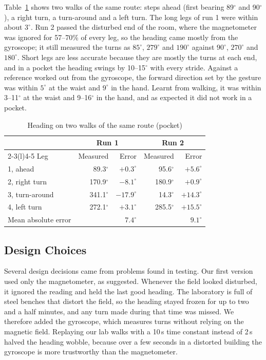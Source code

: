 \documentclass[conference,a4paper]{IEEEtran}
\begin{document}
Table~\ref{tab:route} shows two walks of the same route: steps ahead (first bearing 89$^\circ$
and 90$^\circ$), a right turn, a turn-around and a left turn. The long legs of run 1 were within about
$3^\circ$. Run 2 passed the disturbed end of the room, where the magnetometer was ignored for
57--70\% of every leg, so the heading came mostly from the gyroscope; it still measured the turns
as $85^\circ$, $279^\circ$ and $190^\circ$ against $90^\circ$, $270^\circ$ and $180^\circ$. Short
legs are less accurate because they are mostly the turns at each end, and in a pocket the heading
swings by 10--15$^\circ$ with every stride. Against a reference worked out from the gyroscope, the forward direction set by the gesture was
within $5^\circ$ at the waist and $9^\circ$ in the hand. Learnt from walking, it was within
3--11$^\circ$ at the waist and 9--16$^\circ$ in the hand, and as expected it did not work in a
pocket.

\begin{table}[!h]
\centering
\caption{Heading on two walks of the same route (pocket)}
\label{tab:route}
\begin{tabular}{@{}lrrrr@{}}
\toprule
& \multicolumn{2}{c}{Run 1} & \multicolumn{2}{c}{Run 2} \\
\cmidrule(lr){2-3}\cmidrule(l){4-5}
Leg & Measured & Error & Measured & Error \\
\midrule
1, ahead & 89.3$^\circ$ & $+0.3^\circ$ & 95.6$^\circ$ & $+5.6^\circ$ \\
2, right turn & 170.9$^\circ$ & $-8.1^\circ$ & 180.9$^\circ$ & $+0.9^\circ$ \\
3, turn-around & 341.1$^\circ$ & $-17.9^\circ$ & 14.3$^\circ$ & $+14.3^\circ$ \\
4, left turn & 272.1$^\circ$ & $+3.1^\circ$ & 285.5$^\circ$ & $+15.5^\circ$ \\
\midrule
Mean absolute error & & $7.4^\circ$ & & $9.1^\circ$ \\
\bottomrule
\end{tabular}
\end{table}

\subsection{Design Choices}
Several design decisions came from problems found in testing. Our first version used only the magnetometer, as suggested. Whenever the field looked
disturbed, it ignored the reading and held the last good heading. The laboratory is full of
steel benches that distort the field, so the heading stayed frozen for up to two and a half
minutes, and any turn made during that time was missed. We therefore added the gyroscope,
which measures turns without relying on the magnetic field. Replaying our lab walks
with a 10\,s time constant instead of 2\,s halved the heading wobble, because over a few seconds
in a distorted building the gyroscope is more trustworthy than the magnetometer.
\end{document}
